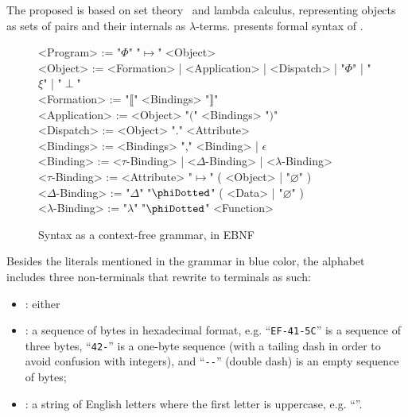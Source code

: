 The proposed \phic{} is based on set theory~\citep{jech2013set} and lambda calculus,
representing objects as sets of pairs and their internals as \(\lambda\)-terms.
 presents formal syntax of \phic{}.

\begin{figure*}
\begin{mdframed}
\raggedright
\begin{ebnf}[8em]
<Program> := "\(\Phi\)" "\(\mapsto\)" <Object> \\
<Object> := <Formation> | <Application> | <Dispatch> | "\(\Phi\)" | "\(\xi\)" | "\(\perp\)" \\
<Formation> := "\(\llbracket\)" <Bindings> "\(\rrbracket\)" \\
<Application> := <Object> "\(\lparen\)" <Bindings> "\(\rparen\)" \\
<Dispatch> := <Object> "." <Attribute> \\
<Bindings> := <Bindings> "," <Binding> | \(\epsilon\) \\
<Binding> := <\(\tau\)-Binding> | <\(\Delta\)-Binding> | <\(\lambda\)-Binding> \\
<\(\tau\)-Binding> := <Attribute> "\(\mapsto\)" ( <Object> | "\(\varnothing\)" ) \\
<\(\Delta\)-Binding> := "\(\Delta\)" "\(\phiDotted\)" ( <Data> | "\(\varnothing\)" ) \\
<\(\lambda\)-Binding> := "\(\lambda\)" "\(\phiDotted\)" <Function> \\
\end{ebnf}
\end{mdframed}
\caption{Syntax as a context-free grammar, in EBNF}
\label{fig:ebnf}
\end{figure*}

Besides the literals mentioned in the grammar in blue color, the alphabet includes three non-terminals that rewrite to terminals as such:
\begin{itemize}
\item {}: either 
\item {}: a sequence of bytes in hexadecimal format, e.g. ``\texttt{EF-41-5C}'' is a sequence of three bytes, ``\texttt{42-}'' is a one-byte sequence (with a tailing dash in order to avoid confusion with integers), and ``\texttt{-{}-}'' (double dash) is an empty sequence of bytes;
\item {}: a string of English letters where the first letter is uppercase, e.g. ``''.
\end{itemize}

